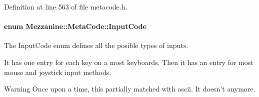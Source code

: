 Definition at line 563 of file metacode.h.

\hypertarget{classMezzanine_1_1MetaCode_a3b5633f0145bf3287cf53a3f05b5563c}{
\paragraph[{InputCode}]{\setlength{\rightskip}{0pt plus 5cm}enum {\bf Mezzanine::MetaCode::InputCode}}\hfill}
\label{classMezzanine_1_1MetaCode_a3b5633f0145bf3287cf53a3f05b5563c}


The InputCode enum defines all the posible types of inputs. 

It has one entry for each key on a most keyboards. Then it has an entry for most mouse and joystick input methods. \begin{DoxyWarning}{Warning}
Once upon a time, this partially matched with ascii. It doesn't anymore. 
\end{DoxyWarning}
